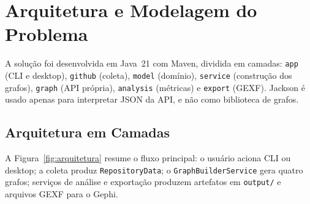 \documentclass[12pt]{article}
\begin{document}
\section{Arquitetura e Modelagem do Problema}
\label{sec:arquitetura}

A solução foi desenvolvida em Java~21 com Maven, dividida em camadas: \texttt{app} (CLI e desktop), \texttt{github} (coleta), \texttt{model} (domínio), \texttt{service} (construção dos grafos), \texttt{graph} (API própria), \texttt{analysis} (métricas) e \texttt{export} (GEXF). Jackson é usado apenas para interpretar JSON da API, e não como biblioteca de grafos.

\subsection{Arquitetura em Camadas}

A Figura~\ref{fig:arquitetura} resume o fluxo principal: o usuário aciona CLI ou desktop; a coleta produz \texttt{RepositoryData}; o \texttt{GraphBuilderService} gera quatro grafos; serviços de análise e exportação produzem artefatos em \texttt{output/} e arquivos GEXF para o Gephi.
\end{document}
